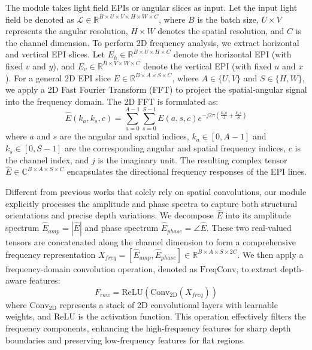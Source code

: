 \documentclass[lettersize,journal]{IEEEtran}
\begin{document}
The module takes light field EPIs or angular slices as input. Let the input light field be denoted as $\mathcal{L} \in \mathbb{R}^{B \times U \times V \times H \times W \times C}$, where $B$ is the batch size, $U \times V$ represents the angular resolution, $H \times W$ denotes the spatial resolution, and $C$ is the channel dimension. To perform 2D frequency analysis, we extract horizontal and vertical EPI slices. Let $E_{h} \in \mathbb{R}^{B \times U \times H \times C}$ denote the horizontal EPI (with fixed $v$ and $y$), and $E_{v} \in \mathbb{R}^{B \times V \times W \times C}$ denote the vertical EPI (with fixed $u$ and $x$). For a general 2D EPI slice $E \in \mathbb{R}^{B \times A \times S \times C}$, where $A \in \{U, V\}$ and $S \in \{H, W\}$, we apply a 2D Fast Fourier Transform (FFT) to project the spatial-angular signal into the frequency domain. The 2D FFT is formulated as:
\begin{equation}
\label{eq:eq5}
\hat{E}(k_a, k_s, c) = \sum_{a=0}^{A-1} \sum_{s=0}^{S-1} E(a, s, c) e^{-j 2\pi \left(\frac{k_a a}{A} + \frac{k_s s}{S}\right)}
\end{equation}
where $a$ and $s$ are the angular and spatial indices, $k_a \in [0, A-1]$ and $k_s \in [0, S-1]$ are the corresponding angular and spatial frequency indices, $c$ is the channel index, and $j$ is the imaginary unit. The resulting complex tensor $\hat{E} \in \mathbb{C}^{B \times A \times S \times C}$ encapsulates the directional frequency responses of the EPI lines.

Different from previous works that solely rely on spatial convolutions, our module explicitly processes the amplitude and phase spectra to capture both structural orientations and precise depth variations. We decompose $\hat{E}$ into its amplitude spectrum $\hat{E}_{amp} = |\hat{E}|$ and phase spectrum $\hat{E}_{phase} = \angle \hat{E}$. These two real-valued tensors are concatenated along the channel dimension to form a comprehensive frequency representation $X_{freq} = [\hat{E}_{amp}, \hat{E}_{phase}] \in \mathbb{R}^{B \times A \times S \times 2C}$. We then apply a frequency-domain convolution operation, denoted as $\text{FreqConv}$, to extract depth-aware features:
\begin{equation}
\label{eq:eq6}
F_{raw} = \text{ReLU}\left( \text{Conv}_{2\text{D}}(X_{freq}) \right)
\end{equation}
where $\text{Conv}_{2\text{D}}$ represents a stack of 2D convolutional layers with learnable weights, and $\text{ReLU}$ is the activation function. This operation effectively filters the frequency components, enhancing the high-frequency features for sharp depth boundaries and preserving low-frequency features for flat regions.
\end{document}
